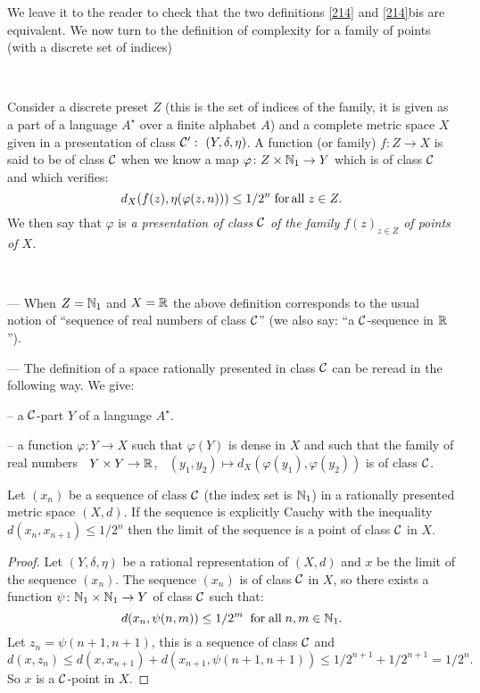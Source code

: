 \medskip
We leave it to the reader to check that the two definitions \ref{214} and \ref{214}bis are equivalent.
We now turn to the definition of complexity for a family of points (with a discrete set of indices)

\begin{definition} \label{217} ~

\noindent 
Consider a discrete preset $Z$ (this is the set of indices of the family, it is given as a part of a language $A^{\star}$ over a finite alphabet $A$) and a complete metric space $X$ given in a presentation of class ${{\cal C}}':~(Y, \delta,\eta)$. 
A function (or family) $f\colon Z \to X$ is said to be of class ${{\cal C}}$ when we know a map $\varphi\colon Z \times \mathbb {N}_1 \to Y$ which is of class ${{\cal C}}$ and which verifies:
\[
d_X(f(z),\eta(\varphi(z,n))) \leq 1/2^n \;{\rm for\, all}\; z \in Z.
\] 
We then say that $\varphi$ is {\em a presentation of class ${{\cal C}}$ of the family $f(z)_{z\in Z}$ of points of $X$.}
\end{definition}

\begin{examples} \label{218}~

\noindent 
--- When $Z = \mathbb {N}_1$ and $X = \mathbb {R}$ the above definition corresponds to the usual notion of ``sequence of real numbers of class ${{\cal C}}$'' (we also say: ``a ${{\cal C}}$-sequence in $\mathbb {R}$''). 

\noindent 
--- The definition of a space rationally presented in class ${{\cal C}}$ can be reread in the following way. We give: 

\noindent 
\spa -- a ${{\cal C}}$-part $Y$ of a language $A^{\star}$. 

\noindent 
\spa -- a function $\varphi\colon Y \to X$ such that $\varphi(Y)$ is dense in $X$ and such that the family of real numbers $\; \; Y \times Y\to \mathbb {R}$, $\; \; (y_1, y_2) \mapsto d_X(\varphi(y_1), \varphi(y_2))$ is of class ${{\cal C}}$. 
\end{examples}
 
\begin{proposition} \label{219}
Let $(x_n)$ be a sequence of class ${{\cal C}}$ (the index set is $\mathbb {N}_1$) in a rationally presented metric space $(X,d)$. If the sequence is explicitly Cauchy with the inequality $d(x_n, x_{n+1}) \leq 1/2^n$ then the limit of the sequence is a point of class ${{\cal C}}$ in $X$.
\end{proposition}

\begin{proof} Let $(Y, \delta, \eta)$ be a rational representation of $(X,d)$ and $x$ be the limit of the sequence $(x_n)$.
The sequence $(x_n)$ is of class ${{\cal C}}$ in $X$, so there exists a function $\psi\colon \mathbb {N}_1 \times \mathbb {N}_1 \to Y$ of class ${{\cal C}}$ such that: 
\[
d(x_n,\psi(n,m)) \leq 1/2^m \; \;{\rm for\; all}\; n, m \in \mathbb {N}_1.
\]
Let $z_n = \psi(n+1,n+1)$,  this is a sequence of class ${{\cal C}}$ and
\[
d(x,z_n) \leq d(x,x_{n+1}) + d(x_{n+1},\psi(n+1,n+1)) \leq 1/2^{n+1} +
1/2^{n+1} = 1/2^n.
\]
So $x$ is a ${{\cal C}}$-point in $X$. 
\end{proof}

